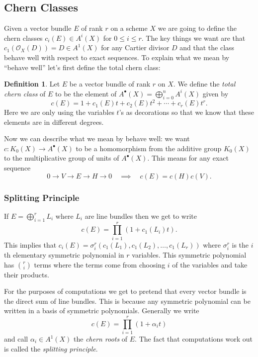 \documentclass[12pt]{article}
\numberwithin{equation}{section}
\theoremstyle{definition}
\newtheorem{definition}[theorem]{Definition}
\theoremstyle{remark}
\newcommand{\Ocal}{\mathcal{O}}
\begin{document}
\subsection{Chern Classes}
Given a vector bundle $E$ of rank $r$ on a scheme $X$ we are going to define the chern classes $c_i(E)\in A^i(X)$ for $0\leq i \leq r$.
The key things we want are that $c_1(\Ocal_X(D)) = D \in A^1(X)$ for any Cartier divisor $D$ and that the class behave well with respect to exact sequences. 
To explain what we mean by ``behave well'' let's first define the total chern class:
\begin{definition}
	Let $E$ be a vector bundle of rank $r$ on $X$.
	We define the \emph{total chern class} of $E$ to be the element of $A^{\bullet}(X) = \bigoplus_{i=0}^n A^i(X)$ given by 
	$$ c(E) = 1 + c_1(E)t + c_2(E)t^2 + \cdots + c_r(E)t^r. $$
	Here we are only using the variables $t$'s as decorations so that we know that these elements are in different degrees. 
\end{definition}
Now we can describe what we mean by behave well: we want $c:K_0(X)\to A^{\bullet}(X)$ to be a homomorphism from the additive group $K_0(X)$ to the multiplicative group of units of $A^{\bullet}(X)$. 
This means for any exact sequence 
$$ 0 \to V \to E \to H \to 0 \quad \implies \quad c(E) = c(H)c(V). $$

\subsubsection{Splitting Principle}
If $E = \bigoplus_{i=1}^r L_i$ where $L_i$ are line bundles then we get to write 
$$ c(E) = \prod_{i=1}^r(1+c_1(L_i)t).$$
This implies that $c_i(E) = \sigma^{r}_i( c_1(L_1), c_1(L_2),\ldots, c_1(L_r) )$ where $\sigma^r_i$ is the $i$th elementary symmetric polynomial in $r$ variables.
This symmetric polynomial has ${r \choose i}$ terms where the terms come from choosing $i$ of the variables and take their products.

For the purposes of computations we get to pretend that every vector bundle is the direct sum of line bundles.
This is because any symmetric polynomial can be written in a basis of symmetric polynomials. 
Generally we write
$$c(E) = \prod_{i=1}^r ( 1+ \alpha_i t )$$
and call $\alpha_i \in A^1(X)$ the \emph{chern roots} of $E$.
The fact that computations work out is called the \emph{splitting principle}. 
\end{document}
